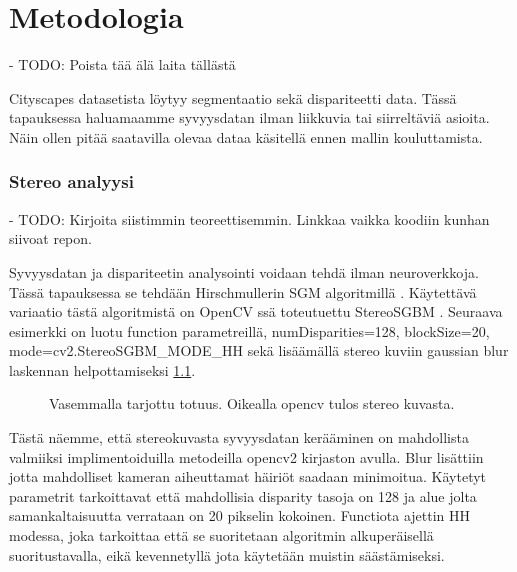 \chapter{Metodologia}
\label{ch:metodologia}

- TODO: Poista tää älä laita tällästä

Cityscapes datasetista löytyy segmentaatio sekä dispariteetti data. Tässä tapauksessa haluamaamme syvyysdatan ilman liikkuvia tai siirreltäviä asioita. Näin ollen pitää saatavilla olevaa dataa käsitellä ennen mallin kouluttamista.

\subsection{Stereo analyysi}

- TODO: Kirjoita siistimmin teoreettisemmin. Linkkaa vaikka koodiin kunhan siivoat repon.

Syvyysdatan ja dispariteetin analysointi voidaan tehdä ilman neuroverkkoja. Tässä tapauksessa se tehdään Hirschmullerin SGM algoritmillä \cite{hirschmuller2005babel}. Käytettävä variaatio tästä algoritmistä on OpenCV ssä toteutuettu StereoSGBM \cite{opencvsgbm}. Seuraava esimerkki on luotu function parametreillä, numDisparities=128, blockSize=20, mode=cv2.StereoSGBM\_MODE\_HH sekä lisäämällä stereo kuviin gaussian blur laskennan helpottamiseksi \ref{fig:disparity1}.

\begin{figure}
\centering
{}
\caption[Tämä on lyhyt kuvateksti.]{Vasemmalla tarjottu totuus. Oikealla opencv tulos stereo kuvasta.}
\label{fig:disparity1}
\end{figure}
    
Tästä näemme, että stereokuvasta syvyysdatan kerääminen on mahdollista valmiiksi implimentoiduilla metodeilla opencv2 kirjaston avulla. Blur lisättiin jotta mahdolliset kameran aiheuttamat häiriöt saadaan minimoitua. Käytetyt parametrit tarkoittavat että mahdollisia disparity tasoja on 128 ja alue jolta samankaltaisuutta verrataan on 20 pikselin kokoinen. Functiota ajettin HH modessa, joka tarkoittaa että se suoritetaan algoritmin alkuperäisellä suoritustavalla, eikä kevennetyllä jota käytetään muistin säästämiseksi.

